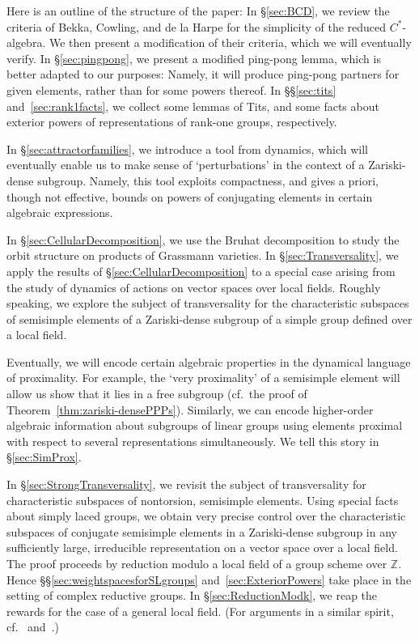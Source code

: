 \documentclass{amsart}
\theoremstyle{plain}
\theoremstyle{definition}
\theoremstyle{remark}
\begin{document}
Here is an outline of the structure of the paper: In \S\ref{sec:BCD}, we review the
criteria of Bekka, Cowling, and de la Harpe for the simplicity of the reduced
$C^{*}$-algebra. We then present a modification of their criteria, which we will
eventually verify. In \S\ref{sec:pingpong}, we present a modified ping-pong lemma, which
is better adapted to our purposes: Namely, it will produce ping-pong partners for given
elements, rather than for some powers thereof. In \S\S\ref{sec:tits}
and~\ref{sec:rank1facts}, we collect some lemmas of Tits, and some facts about exterior
powers of representations of rank-one groups, respectively.

In \S\ref{sec:attractorfamilies}, we introduce a tool from dynamics, which will
eventually enable us to make sense of `perturbations' in the context of a Zariski-dense
subgroup. Namely, this tool exploits compactness, and gives a priori, though not
effective, bounds on powers of conjugating elements in certain algebraic expressions.

In \S\ref{sec:CellularDecomposition}, we use the Bruhat decomposition to study the orbit
structure on products of Grassmann varieties. In \S\ref{sec:Transversality}, we apply the results of
\S\ref{sec:CellularDecomposition} to a special case arising from the
study of dynamics of actions on vector spaces over local fields. Roughly speaking, we
explore the subject of transversality for the characteristic subspaces of semisimple
elements of a Zariski-dense subgroup of a simple group defined over a local field.

Eventually, we will encode certain algebraic properties in the dynamical language of
proximality. For example, the `very proximality' of a semisimple element will allow us show
that it lies in a free subgroup (cf.\ the proof of Theorem~\ref{thm:zariski-densePPPs}).
Similarly, we can encode higher-order algebraic information about subgroups of linear
groups using elements proximal with respect to several representations simultaneously.
We tell this story in \S\ref{sec:SimProx}.

In \S\ref{sec:StrongTransversality}, we revisit the subject of transversality for
characteristic subspaces of 
nontorsion, semisimple elements. Using special facts about simply laced groups, we obtain
very precise control over the characteristic subspaces of conjugate semisimple elements
in a Zariski-dense subgroup in any sufficiently large, irreducible representation on a
vector space over a local field. The proof proceeds by reduction modulo a local field of
a group scheme over $\mathbb{Z}$. Hence \S\S\ref{sec:weightspacesforSLgroups} and~\ref{sec:ExteriorPowers}
take place in the setting of complex reductive groups. In \S\ref{sec:ReductionModk}, we
reap the rewards for the case of a general local field. (For arguments in a similar
spirit, cf.~\cite{MR0372054} and~\cite{MR0277536}.)
\end{document}
